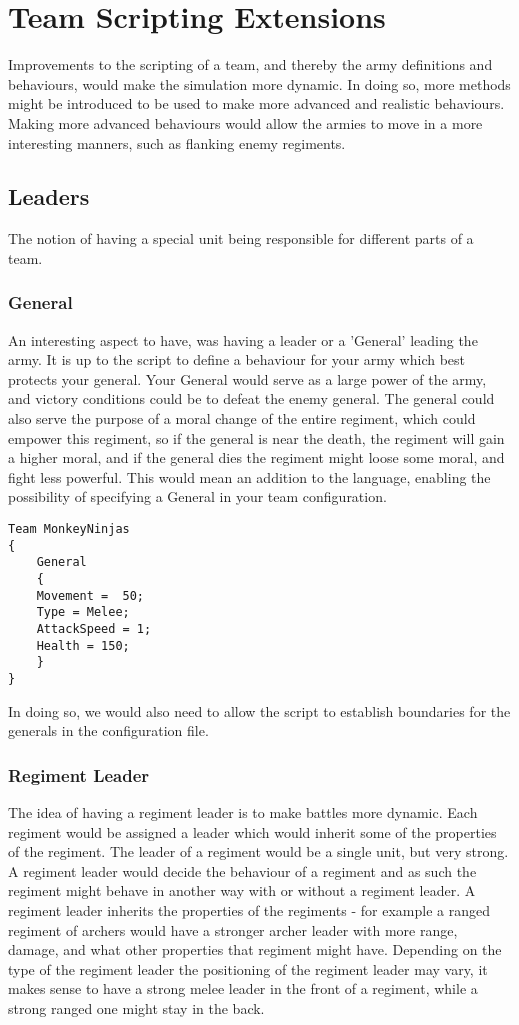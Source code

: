 \section{Team Scripting Extensions}
Improvements to the scripting of a team, and thereby the army definitions and behaviours, would make the simulation more dynamic. In doing so, more methods might be introduced to be used to make more advanced and realistic behaviours. Making more advanced behaviours would allow the armies to move in a more interesting manners, such as flanking enemy regiments.
\subsection{Leaders}
The notion of having a special unit being responsible for different parts of a team.
\subsubsection*{General}
An interesting aspect to have, was having a leader or a 'General' leading the army. It is up to the script to define a behaviour for your army which best protects your general. Your General would serve as a large power of the army, and victory conditions could be to defeat the enemy general.\label{moral} The general could also serve the purpose of a moral change of the entire regiment, which could empower this regiment, so if the general is near the death, the regiment will gain a higher moral, and if the general dies the regiment might loose some moral, and fight less powerful. This would mean an addition to the language, enabling the possibility of specifying a General in your team configuration.
\begin{lstlisting}
Team MonkeyNinjas
{
	General
	{
	Movement =  50;
	Type = Melee;
	AttackSpeed = 1;
	Health = 150;
	}
}

\end{lstlisting}
In doing so, we would also need to allow the script to establish boundaries for the generals in the configuration file.
\subsubsection*{Regiment Leader}
The idea of having a regiment leader is to make battles more dynamic. Each regiment would be assigned a leader which would inherit some of the properties of the regiment.
The leader of a regiment would be a single unit, but very strong. A regiment leader would decide the behaviour of a regiment and as such the regiment might behave in another way with or without a regiment leader. A regiment leader inherits the properties of the regiments - for example a ranged regiment of archers would have a stronger archer leader with more range, damage, and what other properties that regiment might have. Depending on the type of the regiment leader the positioning of the regiment leader may vary, it makes sense to have a strong melee leader in the front of a regiment, while a strong ranged one might stay in the back.

